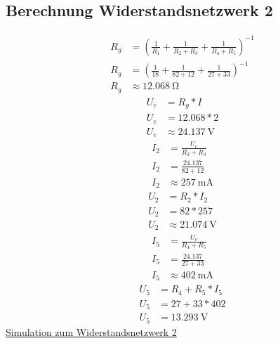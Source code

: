 \documentclass[12pt,a4paper]{amsart}
\begin{document}
\subsection{Berechnung Widerstandsnetzwerk 2}
\begin{align*}
  R_g&=\left(\frac{1}{R_1}+\frac{1}{R_2+R_3}+\frac{1}{R_4+R_5}\right)^{-1}\\
  R_g&=\left(\frac{1}{18}+\frac{1}{82+12}+\frac{1}{27+33}\right)^{-1}\\
  R_g&\approx \qty{12.068}{\ohm}
\end{align*}
\begin{align*}
  U_e&=R_g*I\\
  U_e&=12.068*2\\
  U_e&\approx \qty{24.137}{\volt}
\end{align*}
\begin{align*}
  I_2&=\frac{U_e}{R_2+R_3}\\
  I_2&=\frac{24.137}{82+12}\\
  I_2&\approx \qty{257}{\mA}
\end{align*}
\begin{align*}
  U_2&=R_2*I_2\\
  U_2&=82*257\\
  U_2&\approx \qty{21.074}{\volt}
\end{align*}
\begin{align*}
  I_5&=\frac{U_e}{R_4+R_5}\\
  I_5&=\frac{24.137}{27+33}\\
  I_5&\approx \qty{402}{\mA}
\end{align*}
\begin{align*}
  U_5&=R_4+R_5*I_5\\
  U_5&=27+33*402\\
  U_5&= \qty{13.293}{\volt}
\end{align*}
\href{https://www.falstad.com/circuit/circuitjs.html?ctz=CQAgjCAMB0l3BWKIDMBOESAsLMFMBaMMAKADcQi0AmEagdlqtoA5Jl2t21osw40ANjT0ELDlGgISAJ0rFW7ImFoNa7MCxIp6SsDRBt5Kwxo6zKWcWHqDL4o+xbULgrOFsg3p5A1fubO281ZBQUCwIrOkZ7DzsNFwAHZCFkMEEzdkgSZIVwAzzqBDsILJIAd2NFWMcKmvZvWsrgmMjxEOzKtuimQpjOqp75Aw667jtuprSM2MCoOpbaQuL5yrz9Wm857KA}{Simulation zum Widerstandsnetzwerk 2}
\end{document}
